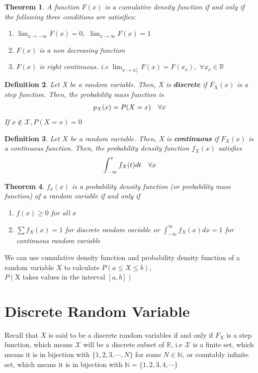 \documentclass[11pt,oneside]{book}
\theoremstyle{newStyle}
\newtheorem{thm}{Theorem}[chapter]
\newtheorem{defn}[thm]{Definition}
\newcommand{\R}{\mathbb{R}}
\newcommand{\N}{\mathbb{N}}
\newcommand{\X}{\mathcal{X}}
\begin{document}
\begin{thm}
A function $F(x)$ is a cumulative density function if and only if the following three conditions are satisifies: \begin{enumerate}[itemsep=0pt, topsep=1pt, partopsep=0pt, label=(\alph*)]
\item $\lim_{x\to -\infty}F(x)=0,$  $\lim_{x\to \infty}F(x)=1$
\item $F(x)$ is a non decreasing function
\item $F(x)$ is right continuous. i.e $\lim_{x\to x_o^+}F(x)=F(x_o),$ $\forall x_o\in \R$
\end{enumerate}
\end{thm}
\begin{defn}
Let X be a random variable. Then, X is \textbf{discrete} if $F_X(x)$ is a step function. Then, the probability mass function is \begin{align*}
p_X(x)=P(X=x)\text{\quad} \forall x
\end{align*}
If $x\notin \X,P(X=x)=0$
\end{defn}
\begin{defn}
Let $X$ be a random variable. Then, X is \textbf{continuous} if $F_X(x)$ is a continuous function. Then, the probability density function $f_X(x)$ satisfies \begin{align*}
\int_{-\infty}^{x}f_X(t)dt\text{\quad} \forall x
\end{align*}
\end{defn}
\begin{thm}
$f_x(x)$ is a probability density function (or probability mass function) of a random variable if and only if \begin{enumerate}
\item $f(x)\geq 0$ for all $x$
\item $\sum f_X(x)=1$ for discrete random variable or $\int_{-\infty}^{\infty}f_X(x)dx =1$ for continuous random variable
\end{enumerate}
\end{thm}
We can use cumulative density function and probability density function of a random variable $X$ to calculate $P(a\leq X\leq b)$, $P(\text{X takes values in the interval }[a,b])$
\chapter[Discrete Random Variable]{Discrete Random Variable}
Recall that $X$ is said to be a discrete random variables if and only if $F_X$ is a step function, which means $\X$ will be a discrete subset of $\R$, i.e $\X$ is a finite set, which means it is in bijection with $\{1,2,3,\cdots,N\}$ for some $N\in \N$, or countably infinite set, which means it is in bijection with $\N=\{1,2,3,4,\cdots\}$
\end{document}
